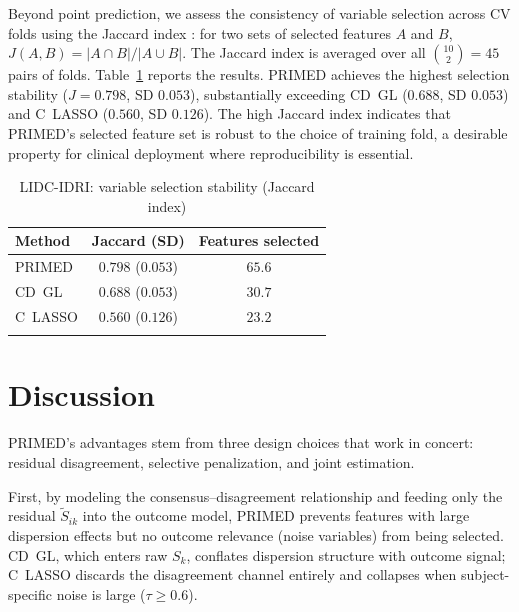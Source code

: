 \documentclass[referee,lineno,pdflatex,sn-vancouver-num]{sn-jnl}
\begin{document}
Beyond point prediction, we assess the consistency of variable selection across CV folds using the Jaccard index \cite{Jaccard1912}: for two sets of selected features $A$ and $B$, $J(A, B) = |A \cap B| / |A \cup B|$.
The Jaccard index is averaged over all $\binom{10}{2} = 45$ pairs of folds.
Table~\ref{tab:lidc_jaccard} reports the results.
PRIMED achieves the highest selection stability ($J = 0.798$, SD $0.053$), substantially exceeding CD~GL ($0.688$, SD $0.053$) and C~LASSO ($0.560$, SD $0.126$).
The high Jaccard index indicates that PRIMED's selected feature set is robust to the choice of training fold, a desirable property for clinical deployment where reproducibility is essential.

\begin{table}[h]
\caption{LIDC-IDRI: variable selection stability (Jaccard index)}\label{tab:lidc_jaccard}
\small
\renewcommand{\arraystretch}{1.1}
\begin{tabular*}{\textwidth}{@{\extracolsep\fill}lcc}
\toprule
Method & Jaccard (SD) & Features selected \\
\midrule
PRIMED  & $\mathbf{0.798}$ ($0.053$) & $65.6$ \\
CD~GL   & $0.688$ ($0.053$) & $30.7$ \\
C~LASSO & $0.560$ ($0.126$) & $23.2$ \\
\botrule
\end{tabular*}
\end{table}


\section{Discussion}\label{sec:discussion}

PRIMED's advantages stem from three design choices that work in concert: residual disagreement, selective penalization, and joint estimation.

First, by modeling the consensus--disagreement relationship and feeding only the residual $\tilde S_{ik}$ into the outcome model, PRIMED prevents features with large dispersion effects but no outcome relevance (noise variables) from being selected.
CD~GL, which enters raw $S_k$, conflates dispersion structure with outcome signal; C~LASSO discards the disagreement channel entirely and collapses when subject-specific noise is large ($\tau \geq 0.6$).
\end{document}
